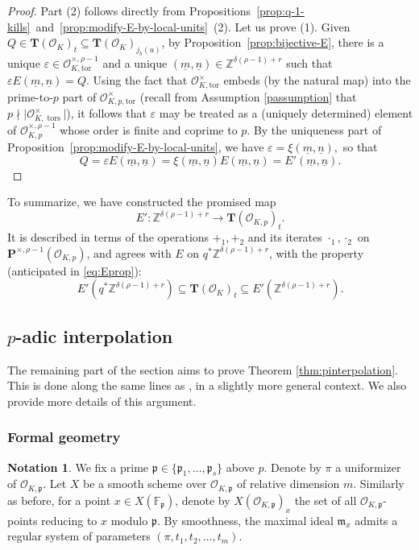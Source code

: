 \documentclass[11pt,oneside]{amsart}
\theoremstyle{plain}
\theoremstyle{definition}
\newtheorem{notation}[theorem]{Notation}
\DeclareMathOperator{\tors}{tors}
\def\TT{\mathbf{T}}
\def\Z{\mathbb{Z}}
\def\F{\mathbb{F}}
\def\P{\mathbf{P}}
\def\oh{\mathcal{O}}
\begin{document}
\begin{proof}
Part (2) follows directly from Propositions~\ref{prop:q-1-kills}~and~\ref{prop:modify-E-by-local-units}~(2). Let us prove (1). Given $Q \in \TT(\oh_K)_t \subseteq \TT(\oh_K)_{j_b(u)}$, by Proposition~\ref{prop:bijective-E}, there is a unique $\varepsilon \in \oh_{K, \mathrm{tor}}^{\times, \rho-1}$ and a unique $(\underline{m}, \underline{n}) \in \Z^{\delta(\rho-1)+r}$ such that $\varepsilon E(\underline{m}, \underline{n})=Q$. Using the fact that $\oh_{K, \mathrm{tor}}^{\times}$ embeds (by the natural map) into the prime-to-$p$ part of $\oh_{K, p, \mathrm{tor}}^{\times}$ (recall from Assumption \ref{passumption} that $p\nmid \vert \oh_{K, \tors}^\times \vert$), it follows that $\varepsilon$ may be treated as a (uniquely determined) element of $\oh_{K, p}^{\times, \rho-1}$ whose order is finite and coprime to $p$. By the uniqueness part of Proposition~\ref{prop:modify-E-by-local-units}, we have $\varepsilon=\xi(\underline{m}, \underline{n}),$ so that 
$$Q=\varepsilon E(\underline{m}, \underline{n})=\xi(\underline{m}, \underline{n})E(\underline{m}, \underline{n})=E'(\underline{m}, \underline{n}).$$
\end{proof} 
To summarize, we have constructed the promised map 
$$E': \Z^{\delta(\rho-1)+r} \rightarrow \TT(\oh_{K, p})_t.$$ It is described in terms of the operations $+_1, +_2$ and its iterates $\cdot_1, \cdot_2$ on $\P^{\times, \rho-1}(\oh_{K, p})$, and agrees with $E$ on $q^* \Z^{\delta (\rho - 1) + r}$,  with the property (anticipated in \eqref{eq:Eprop}):  
$$E'(q^* \Z^{\delta (\rho - 1) + r}) \subseteq \TT(\oh_{K})_t \subseteq E'(\Z^{\delta(\rho - 1) + r}).$$


\subsection{$p$-adic interpolation}\label{s:interpolation}

The remaining part of the section aims to prove Theorem \ref{thm:pinterpolation}. This is done along the same lines as \cite[\S 3, \S 5.1]{EL19}, in a slightly more general context. We also provide more details of this argument. 

\subsubsection{Formal geometry}
\begin{notation}
We fix a prime $\mathfrak{p}\in \{\mathfrak{p}_1, \dots, \mathfrak{p}_s\}$ above $p$. Denote by $\pi$ a  uniformizer of $\oh_{K, \mathfrak{p}}$.
Let $X$ be a smooth scheme over $\oh_{K, \mathfrak{p}}$ of relative dimension $m$. Similarly as before, for a point $x \in X(\F_{\mathfrak{p}})$, denote by $X(\oh_{K, \mathfrak{p}})_x$ the set of all $\oh_{K, \mathfrak{p}}$-points reducing to $x$ modulo $\mathfrak{p}$. 
By smoothness, the maximal ideal $\mathfrak{m}_x$ admits a regular system of parameters $(\pi, t_1, t_2, \dots, t_m)$. 
\end{notation}
\end{document}
